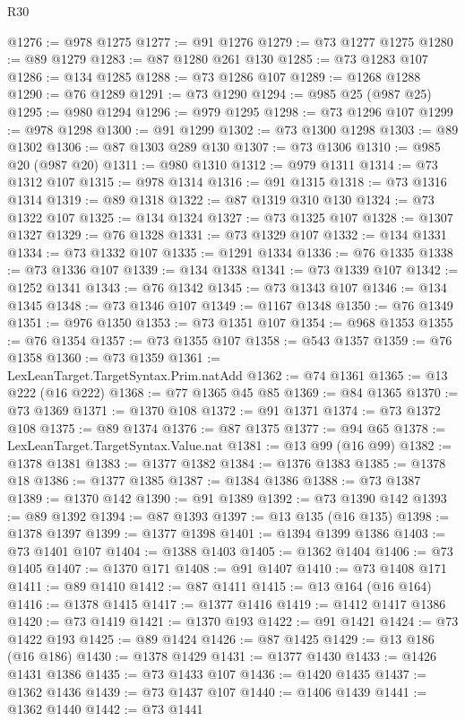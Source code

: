 \begin{lexlean}{R30}
\begin{coremodule}
@1276 := @978 @1275
@1277 := @91 @1276
@1279 := @73 @1277 @1275
@1280 := @89 @1279
@1283 := @87 @1280 @261 @130
@1285 := @73 @1283 @107
@1286 := @134 @1285
@1288 := @73 @1286 @107
@1289 := @1268 @1288
@1290 := @76 @1289
@1291 := @73 @1290
@1294 := @985 @25 (@987 @25)
@1295 := @980 @1294
@1296 := @979 @1295
@1298 := @73 @1296 @107
@1299 := @978 @1298
@1300 := @91 @1299
@1302 := @73 @1300 @1298
@1303 := @89 @1302
@1306 := @87 @1303 @289 @130
@1307 := @73 @1306
@1310 := @985 @20 (@987 @20)
@1311 := @980 @1310
@1312 := @979 @1311
@1314 := @73 @1312 @107
@1315 := @978 @1314
@1316 := @91 @1315
@1318 := @73 @1316 @1314
@1319 := @89 @1318
@1322 := @87 @1319 @310 @130
@1324 := @73 @1322 @107
@1325 := @134 @1324
@1327 := @73 @1325 @107
@1328 := @1307 @1327
@1329 := @76 @1328
@1331 := @73 @1329 @107
@1332 := @134 @1331
@1334 := @73 @1332 @107
@1335 := @1291 @1334
@1336 := @76 @1335
@1338 := @73 @1336 @107
@1339 := @134 @1338
@1341 := @73 @1339 @107
@1342 := @1252 @1341
@1343 := @76 @1342
@1345 := @73 @1343 @107
@1346 := @134 @1345
@1348 := @73 @1346 @107
@1349 := @1167 @1348
@1350 := @76 @1349
@1351 := @976 @1350
@1353 := @73 @1351 @107
@1354 := @968 @1353
@1355 := @76 @1354
@1357 := @73 @1355 @107
@1358 := @543 @1357
@1359 := @76 @1358
@1360 := @73 @1359
@1361 := LexLeanTarget.TargetSyntax.Prim.natAdd
@1362 := @74 @1361
@1365 := @13 @222 (@16 @222)
@1368 := @77 @1365 @45 @85
@1369 := @84 @1365
@1370 := @73 @1369
@1371 := @1370 @108
@1372 := @91 @1371
@1374 := @73 @1372 @108
@1375 := @89 @1374
@1376 := @87 @1375
@1377 := @94 @65
@1378 := LexLeanTarget.TargetSyntax.Value.nat
@1381 := @13 @99 (@16 @99)
@1382 := @1378 @1381
@1383 := @1377 @1382
@1384 := @1376 @1383
@1385 := @1378 @18
@1386 := @1377 @1385
@1387 := @1384 @1386
@1388 := @73 @1387
@1389 := @1370 @142
@1390 := @91 @1389
@1392 := @73 @1390 @142
@1393 := @89 @1392
@1394 := @87 @1393
@1397 := @13 @135 (@16 @135)
@1398 := @1378 @1397
@1399 := @1377 @1398
@1401 := @1394 @1399 @1386
@1403 := @73 @1401 @107
@1404 := @1388 @1403
@1405 := @1362 @1404
@1406 := @73 @1405
@1407 := @1370 @171
@1408 := @91 @1407
@1410 := @73 @1408 @171
@1411 := @89 @1410
@1412 := @87 @1411
@1415 := @13 @164 (@16 @164)
@1416 := @1378 @1415
@1417 := @1377 @1416
@1419 := @1412 @1417 @1386
@1420 := @73 @1419
@1421 := @1370 @193
@1422 := @91 @1421
@1424 := @73 @1422 @193
@1425 := @89 @1424
@1426 := @87 @1425
@1429 := @13 @186 (@16 @186)
@1430 := @1378 @1429
@1431 := @1377 @1430
@1433 := @1426 @1431 @1386
@1435 := @73 @1433 @107
@1436 := @1420 @1435
@1437 := @1362 @1436
@1439 := @73 @1437 @107
@1440 := @1406 @1439
@1441 := @1362 @1440
@1442 := @73 @1441

\end{coremodule}
\end{lexlean}
